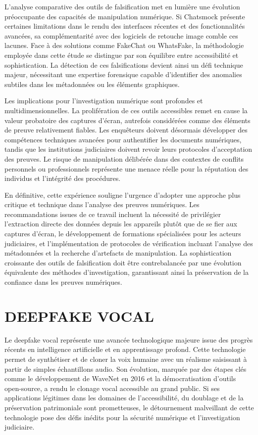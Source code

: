 \documentclass[12pt, a4paper]{article}
\begin{document}
		L'analyse comparative des outils de falsification met en lumière une évolution préoccupante des capacités de manipulation numérique. Si Chatsmock présente certaines limitations dans le rendu des interfaces récentes et des fonctionnalités avancées, sa complémentarité avec des logiciels de retouche image comble ces lacunes. Face à des solutions comme FakeChat ou WhatsFake, la méthodologie employée dans cette étude se distingue par son équilibre entre accessibilité et sophistication. La détection de ces falsifications devient ainsi un défi technique majeur, nécessitant une expertise forensique capable d'identifier des anomalies subtiles dans les métadonnées ou les éléments graphiques.
		
		Les implications pour l'investigation numérique sont profondes et multidimensionnelles. La prolifération de ces outils accessibles remet en cause la valeur probatoire des captures d'écran, autrefois considérées comme des éléments de preuve relativement fiables. Les enquêteurs doivent désormais développer des compétences techniques avancées pour authentifier les documents numériques, tandis que les institutions judiciaires doivent revoir leurs protocoles d'acceptation des preuves. Le risque de manipulation délibérée dans des contextes de conflits personnels ou professionnels représente une menace réelle pour la réputation des individus et l'intégrité des procédures.
		
		En définitive, cette expérience souligne l'urgence d'adopter une approche plus critique et technique dans l'analyse des preuves numériques. Les recommandations issues de ce travail incluent la nécessité de privilégier l'extraction directe des données depuis les appareils plutôt que de se fier aux captures d'écran, le développement de formations spécialisées pour les acteurs judiciaires, et l'implémentation de protocoles de vérification incluant l'analyse des métadonnées et la recherche d'artefacts de manipulation. La sophistication croissante des outils de falsification doit être contrebalancée par une évolution équivalente des méthodes d'investigation, garantissant ainsi la préservation de la confiance dans les preuves numériques.
		
		\section{DEEPFAKE VOCAL}
		
		Le deepfake vocal représente une avancée technologique majeure issue des progrès récents en intelligence artificielle et en apprentissage profond. Cette technologie permet de synthétiser et de cloner la voix humaine avec un réalisme saisissant à partir de simples échantillons audio. Son évolution, marquée par des étapes clés comme le développement de WaveNet en 2016 et la démocratisation d'outils open-source, a rendu le clonage vocal accessible au grand public. Si ses applications légitimes dans les domaines de l'accessibilité, du doublage et de la préservation patrimoniale sont prometteuses, le détournement malveillant de cette technologie pose des défis inédits pour la sécurité numérique et l'investigation judiciaire.
		
\end{document}
